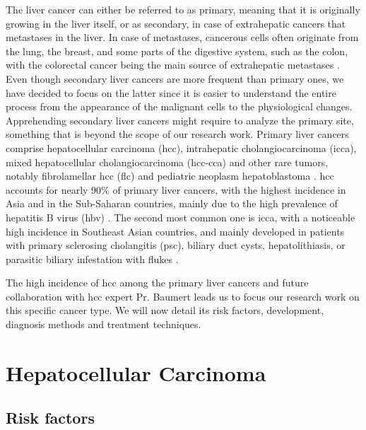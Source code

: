 The liver cancer can either be referred to as primary, meaning that it
is originally growing in the liver itself, or as secondary, in case of
extrahepatic cancers that metastases in the liver.
In case of metastases, cancerous cells often originate from the lung,
the breast, and some parts of the digestive system, such as the colon,
with the colorectal cancer being the main source of extrahepatic
metastases \cite{Hoyer2012a, Sahani2014}.
Even though secondary liver cancers are more frequent than primary ones,
we have decided to focus on the latter since it is easier to understand the entire process
from the appearance of the malignant cells to the physiological changes. Apprehending secondary liver cancers might require to analyze the primary site, something that is beyond the scope of our research work.
Primary liver cancers comprise hepatocellular carcinoma (\ac{hcc}),
intrahepatic cholangiocarcinoma (\ac{icca}), mixed hepatocellular
cholangiocarcinoma (\ac{hcc-cca}) and other rare tumors, notably
fibrolamellar \ac{hcc} (\ac{flc}) and pediatric neoplasm hepatoblastoma
\cite{Sia2017, Lozano2012,20113051318}.
\ac{hcc} accounts for nearly 90\% of primary liver cancers, with the highest
incidence in Asia and in the Sub-Saharan countries, mainly due to the
high prevalence of hepatitis B virus (\ac{hbv}) \cite{Sia2017, Torre2015}. The second most common one is \ac{icca}, with a
noticeable high incidence in Southeast Asian countries, and mainly
developed in patients with primary sclerosing cholangitis (\ac{psc}),
biliary duct cysts, hepatolithiasis, or parasitic biliary infestation
with flukes \cite{Sia2017, Bridgewater2014}.

The high incidence of \ac{hcc} among the primary liver cancers and future collaboration with \ac{hcc} expert Pr. Baumert leads us to focus our research work on
this specific cancer type. We will now detail its risk factors,
development, diagnosis methods and treatment techniques.

\section{Hepatocellular Carcinoma}\label{hepatocellular-carcinoma}

\subsection{Risk factors}\label{risk-factors}

